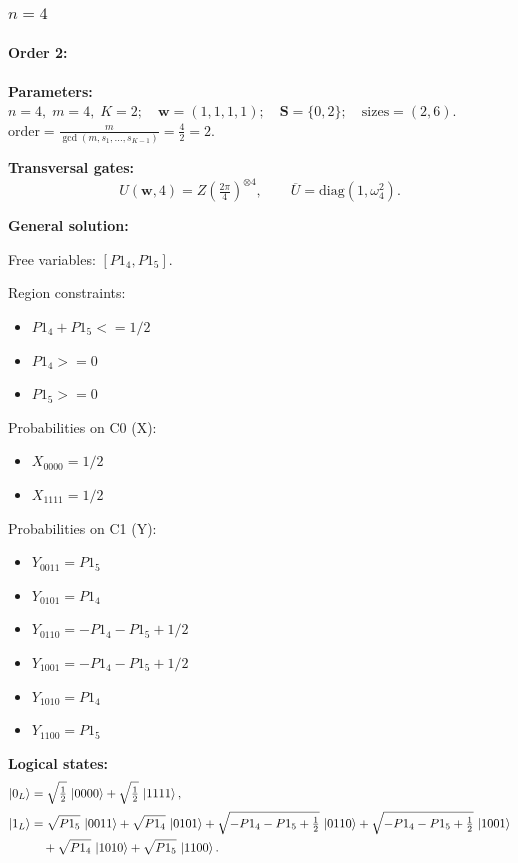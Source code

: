 \documentclass[11pt]{article}
\begin{document}
\subsubsection{$n=4$}
\label{subsubsec:K2n4}
\paragraph{\textbf{Order 2:}}
\noindent\textbf{Parameters:} $n=4,\; m=4,\; K=2;\quad \mathbf w=(1, 1, 1, 1);\quad \mathbf S=\{0, 2\};\quad \text{sizes}=\left(2, 6\right).$ $\displaystyle \text{order}=\frac{m}{\gcd(m,s_1,\dots,s_{K-1})}=\frac{4}{2}=2.$

\noindent\textbf{Transversal gates:}
\[
    U(\mathbf w,4)=Z \left(\tfrac{2\pi}{4}\right)^{\otimes 4},\qquad \overline U=\mathrm{diag}(1,\omega_4^{2}).
\]

\noindent\textbf{General solution:}

Free variables: $[P1_4, P1_5]$. 

Region constraints:
\begin{itemize}
    \item $P1_4 + P1_5 <= 1/2$ 
    \item $P1_4 >= 0$ 
    \item $P1_5 >= 0$
\end{itemize}

Probabilities on C0 (X):
\begin{itemize}
    \item $X_{0000} = 1/2$
    \item $X_{1111} = 1/2$
\end{itemize}

Probabilities on C1 (Y):
\begin{itemize}
    \item $Y_{0011} = P1_5$
    \item $Y_{0101} = P1_4$
    \item $Y_{0110} = -P1_4 - P1_5 + 1/2$
    \item $Y_{1001} = -P1_4 - P1_5 + 1/2$
    \item $Y_{1010} = P1_4$
    \item $Y_{1100} = P1_5$
\end{itemize}

\noindent\textbf{Logical states:}
\begin{align*}
\ket{0_L} &= \sqrt{\tfrac{1}{2}}\,\ket{0000} + \sqrt{\tfrac{1}{2}}\,\ket{1111},
\\[2pt]
\ket{1_L} &= \sqrt{P1_5}\,\ket{0011} + \sqrt{P1_4}\,\ket{0101} + \sqrt{-P1_4 - P1_5 + \tfrac{1}{2}}\,\ket{0110} + \sqrt{-P1_4 - P1_5 + \tfrac{1}{2}}\,\ket{1001} \\
&\quad + \sqrt{P1_4}\,\ket{1010} + \sqrt{P1_5}\,\ket{1100}.
\end{align*}
\end{document}
